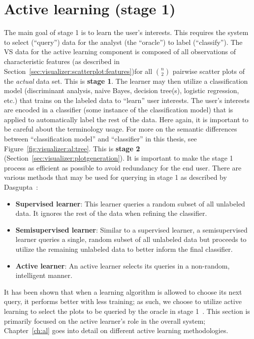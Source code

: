 \section{Active learning (stage 1)}
\label{sec:visualizer:al}

The main goal of stage 1 is to learn the user's interests. This requires the 
system to select (``query'') data for the analyst (the ``oracle'') to label 
(``classify''). The VS data for the active learning component is composed of 
all observations of characteristic features (as described in 
Section~\ref{sec:visualizer:scatterplot:features})for all $n\choose2$ pairwise 
scatter plots of the \textit{actual} data set. This is \textbf{stage 1}. 
The learner may then utilize 
a classification model (discriminant analysis, naive Bayes, decision tree(s), 
logistic regression, etc.) that trains on the labeled data to ``learn'' user 
interests. The user's interests are encoded in a classifier (some instance of 
the classification model) that is applied to automatically label the rest of 
the data. Here again, it is important to be careful about the terminology 
usage. For more on the semantic differences between ``classification model'' 
and ``classifier'' in this thesis, see 
Figure~\ref{fig:visualizer:al:tree}. This is 
\textbf{stage 2} (Section~\ref{sec:visualizer:plotgeneration}). 
It is important to make the stage 1 process as efficient as possible to avoid 
redundancy for the end user. There are various methods that may be used for 
querying in stage 1 as described by Dasgupta~\cite{dasgupta2011}:

\tablespacing
\begin{itemize}
	\item \textbf{Supervised learner}: This learner queries a random 
	subset of all unlabeled data. It ignores the rest of the data when refining 
	the classifier.
	\item \textbf{Semisupervised learner}: Similar to a supervised learner, a 
	semisupervised learner queries a single, random subset of all 
	unlabeled data but proceeds to utilize the remaining unlabeled data to 
	better inform the final classifier.
	\item \textbf{Active learner}: An active learner selects its queries in a 
	non-random, intelligent manner.
\end{itemize}
\bodyspacing

It has been 
shown that when a learning algorithm is allowed to choose its next query, it 
performs better with less training; as such, we choose to utilize active 
learning to select the plots to be queried by the oracle in stage 
1~\cite{settles2010}. This section is primarily focused on the active learner's 
role in the overall system; Chapter~\ref{ch:al} goes into detail on different 
active learning methodologies.

